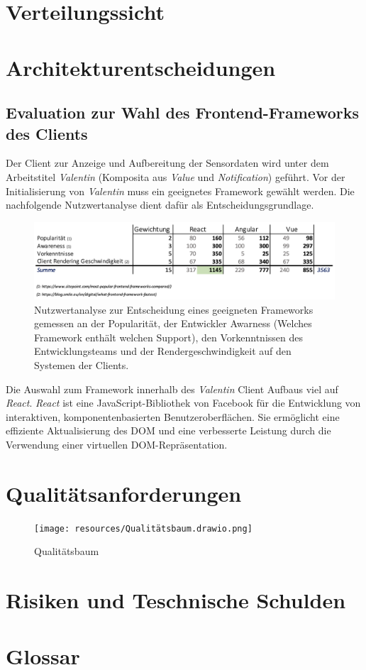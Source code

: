 \documentclass[
]{article}
\begin{document}
\section{Verteilungssicht}

\section{Architekturentscheidungen}
\subsection{Evaluation zur Wahl des Frontend-Frameworks des Clients}

Der Client zur Anzeige und Aufbereitung der Sensordaten wird unter dem Arbeitstitel \textit{Valentin} (Komposita aus \textit{Value} und \textit{Notification}) geführt. Vor der Initialisierung von \textit{Valentin} muss ein geeignetes Framework gewählt werden. Die nachfolgende Nutzwertanalyse dient dafür als Entscheidungsgrundlage. 

\begin{figure}
  \centering
  \includegraphics[width=1\textwidth]{./resources/techevaluationfe.png}
  \caption{Nutzwertanalyse zur Entscheidung eines geeigneten Frameworks gemessen an der Popularität, der Entwickler Awarness (Welches Framework enthält welchen Support), den Vorkenntnissen des Entwicklungsteams und der Rendergeschwindigkeit auf den Systemen der Clients.}
  \label{fig:deine_label}
\end{figure}

Die Auswahl zum Framework innerhalb des \textit{Valentin} Client Aufbaus viel auf \textit{React}. \textit{React} ist eine JavaScript-Bibliothek von Facebook für die Entwicklung von interaktiven, komponentenbasierten Benutzeroberflächen. Sie ermöglicht eine effiziente Aktualisierung des DOM und eine verbesserte Leistung durch die Verwendung einer virtuellen DOM-Repräsentation.

\section{Qualitätsanforderungen}
\begin{figure}[htbp]
	\centering
	\texttt{[image: resources/Qualitätsbaum.drawio.png]}
	\caption{Qualitätsbaum}
	\label{fig:ContextDiagram}
\end{figure}  

\section{Risiken und Teschnische Schulden}
\section{Glossar}
\end{document}
